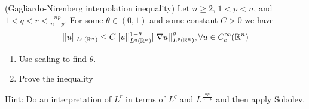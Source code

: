 (Gagliardo-Nirenberg interpolation inequality)
Let $n \geq 2$, $1 < p < n$, and $1 < q < r < \frac{n p}{n - p}$.
For some $\theta \in (0, 1)$ and some constant $C > 0$ we have
$$
||u||_{L^r(\mathbb{R}^n)} \leq C ||u||_{L^q(\mathbb{R}^n)}^{1 - \theta} ||\nabla u||_{L^p(\mathbb{R}^n)}^{\theta}, \forall u \in C_c^\infty(\mathbb{R}^n)
$$

\begin{enumerate}
\item Use scaling to find $\theta$.
\item Prove the inequality
\end{enumerate}
Hint: Do an interpretation of $L^r$ in terms of $L^q$ and $L^{\frac{n p}{n - p}}$ and then apply Sobolev.
